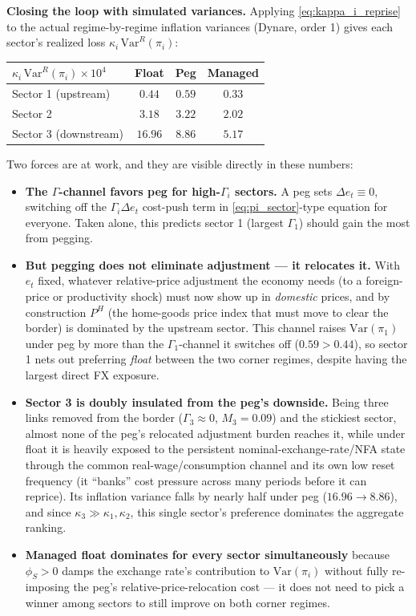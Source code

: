 \documentclass[12pt]{article}
\begin{document}
\textbf{Closing the loop with simulated variances.} Applying \eqref{eq:kappa_i_reprise} to the actual regime-by-regime inflation variances (Dynare, order 1) gives each sector's realized loss $\kappa_i\,\mathrm{Var}^R(\pi_i)$:
\begin{center}
\begin{tabular}{lccc}
\toprule
$\kappa_i\,\mathrm{Var}^R(\pi_i)\times 10^4$ & Float & Peg & Managed \\
\midrule
Sector 1 (upstream) & $0.44$ & $0.59$ & $0.33$ \\
Sector 2 & $3.18$ & $3.22$ & $2.02$ \\
Sector 3 (downstream) & $16.96$ & $8.86$ & $5.17$ \\
\bottomrule
\end{tabular}
\end{center}
Two forces are at work, and they are visible directly in these numbers:
\begin{itemize}
    \item \textbf{The $\Gamma$-channel favors peg for high-$\Gamma_i$ sectors.} A peg sets $\Delta e_t\equiv 0$, switching off the $\Gamma_i\Delta e_t$ cost-push term in \eqref{eq:pi_sector}-type equation for everyone. Taken alone, this predicts sector 1 (largest $\Gamma_1$) should gain the most from pegging.
    \item \textbf{But pegging does not eliminate adjustment --- it relocates it.} With $e_t$ fixed, whatever relative-price adjustment the economy needs (to a foreign-price or productivity shock) must now show up in \emph{domestic} prices, and by construction $P^H$ (the home-goods price index that must move to clear the border) is dominated by the upstream sector. This channel raises $\mathrm{Var}(\pi_1)$ under peg by more than the $\Gamma_1$-channel it switches off ($0.59>0.44$), so sector 1 nets out preferring \emph{float} between the two corner regimes, despite having the largest direct FX exposure.
    \item \textbf{Sector 3 is doubly insulated from the peg's downside.} Being three links removed from the border ($\Gamma_3\approx0$, $M_3=0.09$) and the stickiest sector, almost none of the peg's relocated adjustment burden reaches it, while under float it is heavily exposed to the persistent nominal-exchange-rate/NFA state through the common real-wage/consumption channel and its own low reset frequency (it ``banks'' cost pressure across many periods before it can reprice). Its inflation variance falls by nearly half under peg ($16.96\to8.86$), and since $\kappa_3\gg\kappa_1,\kappa_2$, this single sector's preference dominates the aggregate ranking.
    \item \textbf{Managed float dominates for every sector simultaneously} because $\phi_S>0$ damps the exchange rate's contribution to $\mathrm{Var}(\pi_i)$ without fully re-imposing the peg's relative-price-relocation cost --- it does not need to pick a winner among sectors to still improve on both corner regimes.
\end{itemize}
\end{document}
